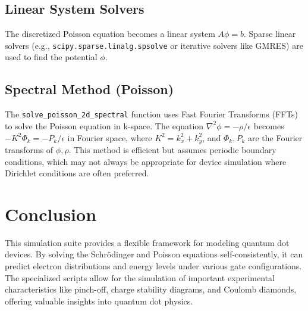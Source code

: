 \documentclass{article}
\begin{document}
\subsection{Linear System Solvers}
The discretized Poisson equation becomes a linear system $A\phi = b$. Sparse linear solvers (e.g., \texttt{scipy.sparse.linalg.spsolve} or iterative solvers like GMRES) are used to find the potential $\phi$.

\subsection{Spectral Method (Poisson)}
The \texttt{solve\_poisson\_2d\_spectral} function uses Fast Fourier Transforms (FFTs) to solve the Poisson equation in k-space. The equation $\nabla^2 \phi = -\rho/\epsilon$ becomes $-K^2 \Phi_k = -P_k/\epsilon$ in Fourier space, where $K^2 = k_x^2 + k_y^2$, and $\Phi_k, P_k$ are the Fourier transforms of $\phi, \rho$. This method is efficient but assumes periodic boundary conditions, which may not always be appropriate for device simulation where Dirichlet conditions are often preferred.

\section{Conclusion}
This simulation suite provides a flexible framework for modeling quantum dot devices. By solving the Schrödinger and Poisson equations self-consistently, it can predict electron distributions and energy levels under various gate configurations. The specialized scripts allow for the simulation of important experimental characteristics like pinch-off, charge stability diagrams, and Coulomb diamonds, offering valuable insights into quantum dot physics.
\end{document}
